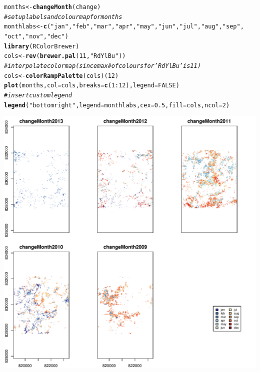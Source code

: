 \documentclass{article}\usepackage[]{graphicx}\usepackage[]{color}
\makeatletter
\def\maxwidth{ %
  \ifdim\Gin@nat@width>\linewidth
    \linewidth
  \else
    \Gin@nat@width
  \fi
}
\newcommand{\hlnum}[1]{\textcolor[rgb]{0.686,0.059,0.569}{#1}}%
\newcommand{\hlstr}[1]{\textcolor[rgb]{0.192,0.494,0.8}{#1}}%
\newcommand{\hlcom}[1]{\textcolor[rgb]{0.678,0.584,0.686}{\textit{#1}}}%
\newcommand{\hlopt}[1]{\textcolor[rgb]{0,0,0}{#1}}%
\newcommand{\hlstd}[1]{\textcolor[rgb]{0.345,0.345,0.345}{#1}}%
\newcommand{\hlkwb}[1]{\textcolor[rgb]{0.69,0.353,0.396}{#1}}%
\newcommand{\hlkwc}[1]{\textcolor[rgb]{0.333,0.667,0.333}{#1}}%
\newcommand{\hlkwd}[1]{\textcolor[rgb]{0.737,0.353,0.396}{\textbf{#1}}}%
\newenvironment{kframe}{%
 \def\at@end@of@kframe{}%
 \ifinner\ifhmode%
  \def\at@end@of@kframe{\end{minipage}}%
  \begin{minipage}{\columnwidth}%
 \fi\fi%
 \def\FrameCommand##1{\hskip\@totalleftmargin \hskip-\fboxsep
 \colorbox{shadecolor}{##1}\hskip-\fboxsep
     \hskip-\linewidth \hskip-\@totalleftmargin \hskip\columnwidth}%
 \MakeFramed {\advance\hsize-\width
   \@totalleftmargin\z@ \linewidth\hsize
   \@setminipage}}%
 {\par\unskip\endMakeFramed%
 \at@end@of@kframe}
\newenvironment{knitrout}{}{} %
\makeatother
\begin{document}
\begin{knitrout}
\color{fgcolor}\begin{kframe}
\begin{alltt}
\hlstd{months} \hlkwb{<-} \hlkwd{changeMonth}\hlstd{(change)}
\hlcom{# set up labels and colourmap for months}
\hlstd{monthlabs} \hlkwb{<-} \hlkwd{c}\hlstd{(}\hlstr{"jan"}\hlstd{,} \hlstr{"feb"}\hlstd{,} \hlstr{"mar"}\hlstd{,} \hlstr{"apr"}\hlstd{,} \hlstr{"may"}\hlstd{,} \hlstr{"jun"}\hlstd{,} \hlstr{"jul"}\hlstd{,} \hlstr{"aug"}\hlstd{,} \hlstr{"sep"}\hlstd{,}
    \hlstr{"oct"}\hlstd{,} \hlstr{"nov"}\hlstd{,} \hlstr{"dec"}\hlstd{)}
\hlkwd{library}\hlstd{(RColorBrewer)}
\hlstd{cols} \hlkwb{<-} \hlkwd{rev}\hlstd{(}\hlkwd{brewer.pal}\hlstd{(}\hlnum{11}\hlstd{,} \hlstr{"RdYlBu"}\hlstd{))}
\hlcom{# interpolate colormap (since max # of colours for 'RdYlBu' is 11)}
\hlstd{cols} \hlkwb{<-} \hlkwd{colorRampPalette}\hlstd{(cols)(}\hlnum{12}\hlstd{)}
\hlkwd{plot}\hlstd{(months,} \hlkwc{col} \hlstd{= cols,} \hlkwc{breaks} \hlstd{=} \hlkwd{c}\hlstd{(}\hlnum{1}\hlopt{:}\hlnum{12}\hlstd{),} \hlkwc{legend} \hlstd{=} \hlnum{FALSE}\hlstd{)}
\hlcom{# insert custom legend}
\hlkwd{legend}\hlstd{(}\hlstr{"bottomright"}\hlstd{,} \hlkwc{legend} \hlstd{= monthlabs,} \hlkwc{cex} \hlstd{=} \hlnum{0.5}\hlstd{,} \hlkwc{fill} \hlstd{= cols,} \hlkwc{ncol} \hlstd{=} \hlnum{2}\hlstd{)}
\end{alltt}
\end{kframe}
\includegraphics[width=\maxwidth]{figure/changeMonth} 

\end{knitrout}
\end{document}
